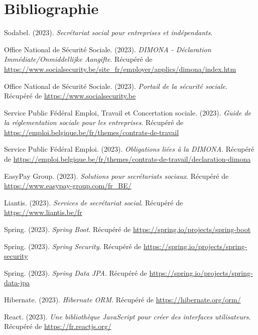 \documentclass[12pt,a4paper]{report}
\begin{document}
\chapter*{Bibliographie}

\begin{thebibliography}{99}

Sodabel. (2023).
\textit{Secrétariat social pour entreprises et indépendants}.

Office National de Sécurité Sociale. (2023).
\textit{DIMONA - Déclaration Immédiate/Onmiddellijke Aangifte}.
Récupéré de \url{https://www.socialsecurity.be/site_fr/employer/applics/dimona/index.htm}

Office National de Sécurité Sociale. (2023).
\textit{Portail de la sécurité sociale}.
Récupéré de \url{https://www.socialsecurity.be}

Service Public Fédéral Emploi, Travail et Concertation sociale. (2023).
\textit{Guide de la réglementation sociale pour les entreprises}.
Récupéré de \url{https://emploi.belgique.be/fr/themes/contrats-de-travail}

Service Public Fédéral Emploi. (2023).
\textit{Obligations liées à la DIMONA}.
Récupéré de \url{https://emploi.belgique.be/fr/themes/contrats-de-travail/declaration-dimona}

EasyPay Group. (2023).
\textit{Solutions pour secrétariats sociaux}.
Récupéré de \url{https://www.easypay-group.com/fr_BE/}

Liantis. (2023).
\textit{Services de secrétariat social}.
Récupéré de \url{https://www.liantis.be/fr}

Spring. (2023).
\textit{Spring Boot}.
Récupéré de \url{https://spring.io/projects/spring-boot}

Spring. (2023).
\textit{Spring Security}.
Récupéré de \url{https://spring.io/projects/spring-security}

Spring. (2023).
\textit{Spring Data JPA}.
Récupéré de \url{https://spring.io/projects/spring-data-jpa}

Hibernate. (2023).
\textit{Hibernate ORM}.
Récupéré de \url{https://hibernate.org/orm/}

React. (2023).
\textit{Une bibliothèque JavaScript pour créer des interfaces utilisateurs}.
Récupéré de \url{https://fr.reactjs.org/}


\end{thebibliography}
\end{document}
